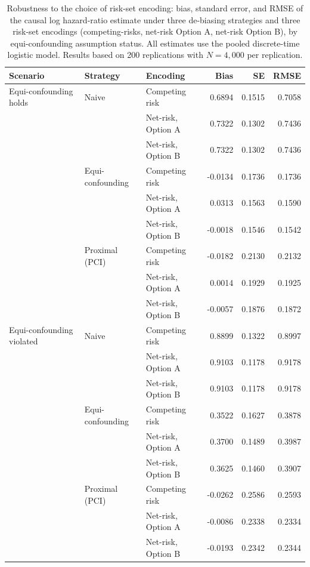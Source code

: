 \begin{table}
\centering
\begin{tabular}{lllrrr}
\toprule
Scenario & Strategy & Encoding & Bias & SE & RMSE \\
\midrule
Equi-confounding holds & Naive & Competing risk & 0.6894 & 0.1515 & 0.7058 \\
 &  & Net-risk, Option A & 0.7322 & 0.1302 & 0.7436 \\
 &  & Net-risk, Option B & 0.7322 & 0.1302 & 0.7436 \\
\addlinespace
 & Equi-confounding & Competing risk & -0.0134 & 0.1736 & 0.1736 \\
 &  & Net-risk, Option A & 0.0313 & 0.1563 & 0.1590 \\
 &  & Net-risk, Option B & -0.0018 & 0.1546 & 0.1542 \\
\addlinespace
 & Proximal (PCI) & Competing risk & -0.0182 & 0.2130 & 0.2132 \\
 &  & Net-risk, Option A & 0.0014 & 0.1929 & 0.1925 \\
 &  & Net-risk, Option B & -0.0057 & 0.1876 & 0.1872 \\
\addlinespace
Equi-confounding violated & Naive & Competing risk & 0.8899 & 0.1322 & 0.8997 \\
 &  & Net-risk, Option A & 0.9103 & 0.1178 & 0.9178 \\
 &  & Net-risk, Option B & 0.9103 & 0.1178 & 0.9178 \\
\addlinespace
 & Equi-confounding & Competing risk & 0.3522 & 0.1627 & 0.3878 \\
 &  & Net-risk, Option A & 0.3700 & 0.1489 & 0.3987 \\
 &  & Net-risk, Option B & 0.3625 & 0.1460 & 0.3907 \\
\addlinespace
 & Proximal (PCI) & Competing risk & -0.0262 & 0.2586 & 0.2593 \\
 &  & Net-risk, Option A & -0.0086 & 0.2338 & 0.2334 \\
 &  & Net-risk, Option B & -0.0193 & 0.2342 & 0.2344 \\
\bottomrule
\end{tabular}
\caption{Robustness to the choice of risk-set encoding: bias, standard error, and RMSE of the causal log hazard-ratio estimate under three de-biasing strategies and three risk-set encodings (competing-risks, net-risk Option A, net-risk Option B), by equi-confounding assumption status. All estimates use the pooled discrete-time logistic model. Results based on 200 replications with $N = 4{,}000$ per replication.}
\label{tab:unified_encoding}
\end{table}
